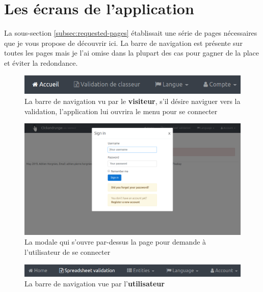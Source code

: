 \section{Les écrans de l'application}
\label{sec:pages-presentation}

La sous-section \ref{subsec:requested-pages} établissait une série de pages nécessaires que je vous propose de découvrir ici.
La barre de navigation est présente sur toutes les pages mais je l'ai omise dans la plupart des cas pour gagner de la place et éviter la redondance.

\begin{figure}[ht]
    \centering
    \includegraphics[width=1\textwidth]{images/screenshot/navbar-visitor.png}
    \caption{La barre de navigation vu par le \textbf{visiteur}, s'il désire naviguer vers la validation, l'application lui ouvrira le menu pour se connecter}
    \label{fig:navbar-visitor}
\end{figure}

\begin{figure}[ht]
    \centering
    \includegraphics[width=1\textwidth]{images/screenshot/login-modal.png}
    \caption{La modale qui s'ouvre par-dessus la page pour demande à l'utilisateur de se connecter}
    \label{fig:login-modal}
\end{figure}

\begin{figure}[ht]
    \centering
    \includegraphics[width=1\textwidth]{images/screenshot/navbar-user.png}
    \caption{La barre de navigation vue par l'\textbf{utilisateur}}
    \label{fig:navbar-user}
\end{figure}

